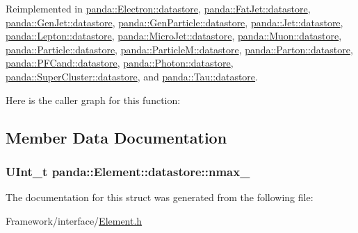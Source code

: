 Reimplemented in \hyperlink{structpanda_1_1Electron_1_1datastore_af2c384514f539bcc78e55284b7eb3b67}{panda::Electron::datastore}, \hyperlink{structpanda_1_1FatJet_1_1datastore_a7c0b79a4a6e7875278841d4bc8a7deba}{panda::FatJet::datastore}, \hyperlink{structpanda_1_1GenJet_1_1datastore_a7b9f67fdc168e7a372a9430c2b9866e3}{panda::GenJet::datastore}, \hyperlink{structpanda_1_1GenParticle_1_1datastore_ae4c5f9b8868d49879bba872aeb7b1027}{panda::GenParticle::datastore}, \hyperlink{structpanda_1_1Jet_1_1datastore_ae5a3ebcab7eefec1efc08e4f714ce2ad}{panda::Jet::datastore}, \hyperlink{structpanda_1_1Lepton_1_1datastore_a0a158cefd0f32a98625eb5736c414b01}{panda::Lepton::datastore}, \hyperlink{structpanda_1_1MicroJet_1_1datastore_a5dad86e6e7ed7f7ee5ffb793bb81cbbe}{panda::MicroJet::datastore}, \hyperlink{structpanda_1_1Muon_1_1datastore_a930f982ca62e2c7ceeb62dfcd5e03db9}{panda::Muon::datastore}, \hyperlink{structpanda_1_1Particle_1_1datastore_a82fcd5398687827418d8bdcbfc16d661}{panda::Particle::datastore}, \hyperlink{structpanda_1_1ParticleM_1_1datastore_a0329bec2c84d16ff16e15824890e7a86}{panda::ParticleM::datastore}, \hyperlink{structpanda_1_1Parton_1_1datastore_a923a18c356315d4083798fe11bb2c942}{panda::Parton::datastore}, \hyperlink{structpanda_1_1PFCand_1_1datastore_a7efac265d60666c7ce27d78adbbf0fbb}{panda::PFCand::datastore}, \hyperlink{structpanda_1_1Photon_1_1datastore_a809ca2b31f632a8503ee2dc839be55ed}{panda::Photon::datastore}, \hyperlink{structpanda_1_1SuperCluster_1_1datastore_a266826bf3493fc0aada999aee9d86345}{panda::SuperCluster::datastore}, and \hyperlink{structpanda_1_1Tau_1_1datastore_a528e0b260c39c11862f8631cf9e1743e}{panda::Tau::datastore}.

Here is the caller graph for this function:

\subsection{Member Data Documentation}
\hypertarget{structpanda_1_1Element_1_1datastore_ad34a7e5ccf28ff223cdb4d24f0e97375}{
\subsubsection[{nmax\_\-}]{\setlength{\rightskip}{0pt plus 5cm}UInt\_\-t {\bf panda::Element::datastore::nmax\_\-}}}
\label{structpanda_1_1Element_1_1datastore_ad34a7e5ccf28ff223cdb4d24f0e97375}


The documentation for this struct was generated from the following file:\begin{DoxyCompactItemize}
\item 
Framework/interface/\hyperlink{Element_8h}{Element.h}\end{DoxyCompactItemize}
